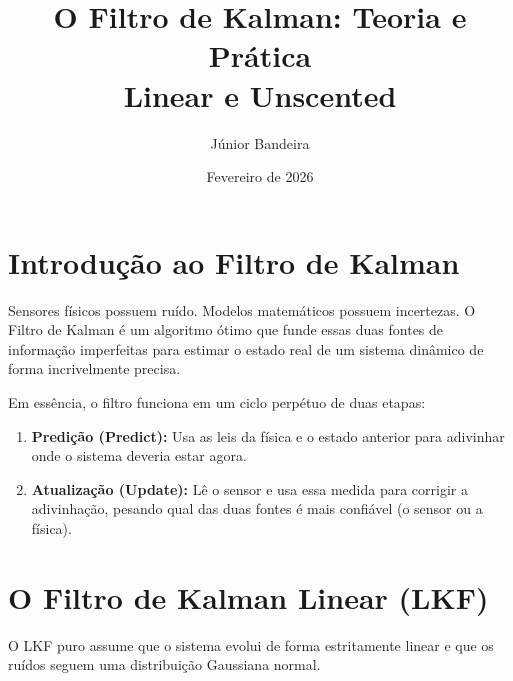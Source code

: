 \documentclass[12pt,a4paper]{article}
\title{\textbf{O Filtro de Kalman: Teoria e Prática} \\ \large Linear e Unscented}
\author{Júnior Bandeira}
\date{Fevereiro de 2026}
\begin{document}
\maketitle
\tableofcontents
\newpage

\section{Introdução ao Filtro de Kalman}
\label{sec:kalman}

Sensores físicos possuem ruído. Modelos matemáticos possuem incertezas. O Filtro de Kalman é um algoritmo ótimo que funde essas duas fontes de informação imperfeitas para estimar o estado real de um sistema dinâmico de forma incrivelmente precisa.

Em essência, o filtro funciona em um ciclo perpétuo de duas etapas:
\begin{enumerate}
    \item \textbf{Predição (Predict):} Usa as leis da física e o estado anterior para adivinhar onde o sistema deveria estar agora.
    \item \textbf{Atualização (Update):} Lê o sensor e usa essa medida para corrigir a adivinhação, pesando qual das duas fontes é mais confiável (o sensor ou a física).
\end{enumerate}

\section{O Filtro de Kalman Linear (LKF)}

O LKF puro assume que o sistema evolui de forma estritamente linear e que os ruídos seguem uma distribuição Gaussiana normal.
\end{document}
